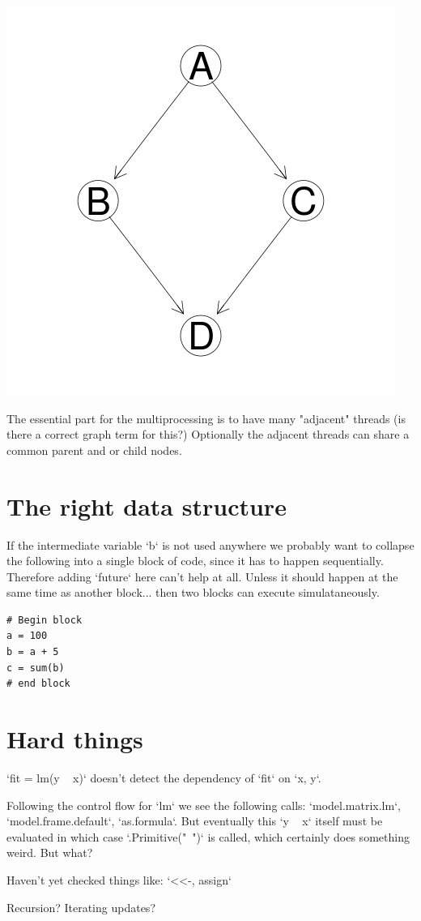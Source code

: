 \documentclass[12pt]{article}
\begin{document}
\centerline{\includegraphics{../codedepends/simple_graph.png}}

The essential part for the multiprocessing is to have many "adjacent"
threads (is there a correct graph term for this?)
Optionally the adjacent threads can share a common parent and or child
nodes.

\section{The right data structure}

If the intermediate variable `b` is not used anywhere we probably want to
collapse the following into a single block of code, since it has to happen
sequentially. Therefore adding `future` here can't help at all. Unless it
should happen at the same time as another block... then two blocks can
execute simulataneously.

\begin{verbatim}
# Begin block
a = 100
b = a + 5
c = sum(b)
# end block
\end{verbatim}

\section{Hard things}

`fit = lm(y ~ x)` doesn't detect the dependency of `fit` on `x, y`.

Following the control flow for `lm` we see the following calls:
`model.matrix.lm`, `model.frame.default`, `as.formula`. But eventually this
`y ~ x` itself must be evaluated in which case `.Primitive("~")` is called,
which certainly does something weird. But what?

Haven't yet checked things like:
`<<-, assign`

Recursion? Iterating updates?

\newpage


 
\end{document}
